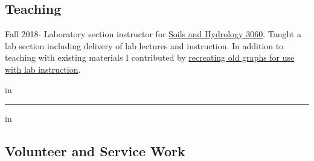 \documentclass[10pt,letterpaper]{article}
\begin{document}
\subsection*{Teaching}

Fall 2018- Laboratory section instructor for \href{http://www.hydrology.uga.edu/rasmussen/class/3060/index.html}{Soils and Hydrology 3060}. Taught a lab section including delivery of lab lectures and instruction. In addition to teaching with existing materials I contributed by \href{https://seyounger.github.io/soils_and_hydro_teaching/}{recreating old graphs for use with lab instruction}.

 in

\hrule
\vspace{-0.4em}
 in
\subsection*{Volunteer and Service Work}
\end{document}
